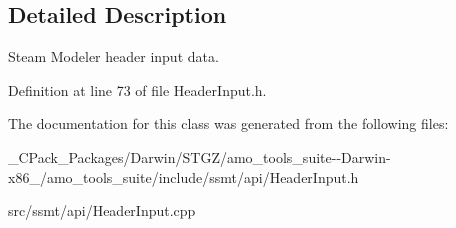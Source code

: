 \subsection{Detailed Description}
Steam Modeler header input data. 

Definition at line 73 of file Header\+Input.\+h.



The documentation for this class was generated from the following files\+:\begin{DoxyCompactItemize}
\item 
\+\_\+\+C\+Pack\+\_\+\+Packages/\+Darwin/\+S\+T\+G\+Z/amo\+\_\+tools\+\_\+suite-\/-\/\+Darwin-\/x86\+\_/amo\+\_\+tools\+\_\+suite/include/ssmt/api/Header\+Input.\+h\item 
src/ssmt/api/Header\+Input.\+cpp\end{DoxyCompactItemize}
